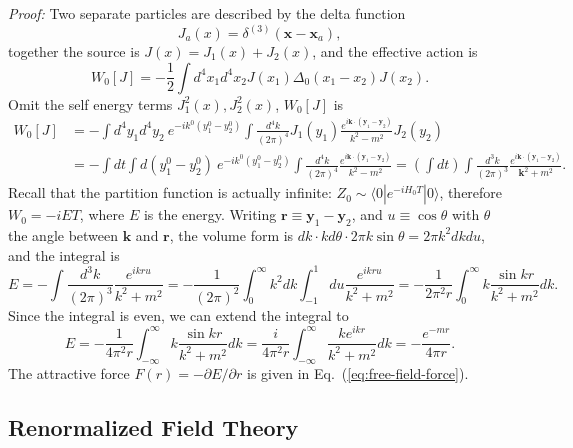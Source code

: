 \documentclass[aps,prb,superscriptaddress,nofootinbib]{revtex4}
\begin{document}
\noindent\textit{Proof:}
Two separate particles are described by the delta function $$J_a(x) = \delta^{(3)}(\bm x - \bm x_a),$$ together the source is $J(x) = J_1(x) + J_2(x)$, and the effective action is $$W_0[J] = -\frac{1}{2}\int d^4x_1 d^4 x_2 J(x_1) \Delta_0(x_1-x_2) J(x_2).$$
Omit the self energy terms $J_1^2(x), J_2^2(x)$, $W_0[J]$ is
\begin{equation*}
\begin{aligned}
	W_0[J] &= -\int d^4 y_1 d^4 y_2\ e^{-ik^0(y_1^0-y_2^0)}\int \frac{d^4 k}{(2\pi)^4} J_1(y_1)\frac{e^{i\bm k\cdot (\bm y_1-\bm y_2)}}{k^2-m^2} J_2(y_2) \\
	&= -\int  dt \int d (y_1^0 - y_2^0) \ e^{-ik^0(y_1^0-y_2^0)}\int \frac{d^4 k}{(2\pi)^4} \frac{e^{i\bm k\cdot (\bm y_1-\bm y_2)}}{k^2-m^2} 
	= \left(\int dt \right)\int \frac{d^3 k}{(2\pi)^3} \frac{e^{i\bm k\cdot (\bm y_1-\bm y_2)}}{\bm k^2 + m^2}.
\end{aligned}
\end{equation*}
Recall that the partition function is actually infinite: $Z_0 \sim \langle 0| e^{-i H_0 T} |0\rangle$, therefore $W_0 = -i E T$, where $E$ is the energy.
Writing $\bm r \equiv \bm y_1 - \bm y_2$, and $u \equiv \cos\theta$ with $\theta$ the angle between $\bm k$ and $\bm r$, the volume form is $dk \cdot kd\theta \cdot  2\pi k \sin \theta = 2\pi k^2 dk du$, and the integral is
\begin{equation}
	E = -\int \frac{d^3 k}{(2\pi)^3} \frac{e^{i k r u}}{k^2 + m^2} 
	= - \frac{1}{(2\pi)^2} \int_0^\infty k^2 dk \int_{-1}^1 du \frac{e^{ikru}}{k^2 +m^2} 
	= -\frac{1}{2\pi^2 r} \int_0^\infty k  \frac{\sin kr}{k^2 +m^2} dk.
\end{equation}
Since the integral is even, we can extend the integral to
\begin{equation}
	E = -\frac{1}{4\pi^2 r} \int_{-\infty}^\infty k  \frac{\sin kr}{k^2 +m^2} dk 
	= \frac{i}{4\pi^2 r} \int_{-\infty}^\infty \frac{k e^{ikr}}{k^2 +m^2} dk
	= -\frac{e^{-mr}}{4\pi r}.
\end{equation}
The attractive force $F(r) = -\partial E/\partial r$ is given in Eq.~(\ref{eq:free-field-force}).





\subsection{Renormalized Field Theory}
\end{document}
